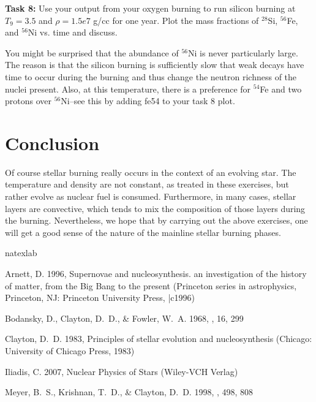 \documentclass[manuscript]{aastex62}
\begin{document}
{\bf Task 8:}  Use your output from your oxygen burning to run silicon burning
at $T_9 = 3.5$ and $\rho = 1.5e7$ g/cc for one year.
Plot the mass fractions of
$^{28}$Si, $^{56}$Fe, and $^{56}$Ni vs. time and discuss.

You might be surprised that the abundance of $^{56}$Ni is never particularly
large.  The reason is that the silicon burning is sufficiently slow that
weak decays have time to occur during the burning and thus change the
neutron richness of the nuclei present.  Also, at this temperature, there
is a preference for $^{54}$Fe and two protons over $^{56}$Ni--see this by
adding fe54 to your task 8 plot.

\section{Conclusion}

Of course stellar burning really occurs in the context of an evolving star.
The temperature and density are not constant, as treated in these exercises,
but rather evolve as nuclear fuel is consumed.  Furthermore, in many cases,
stellar layers are convective, which tends to mix the composition of those
layers during the burning.  
Nevertheless, we hope that by
carrying out the above exercises, one will get a good sense of the
nature of the mainline stellar burning phases.

\begin{thebibliography}{5}
\expandafter\ifx\csname natexlab\endcsname\relax\def\natexlab#1{#1}\fi

{Arnett}, D. 1996, {Supernovae and nucleosynthesis. an investigation of the
  history of matter, from the Big Bang to the present} (Princeton series in
  astrophysics, Princeton, NJ: Princeton University Press, |c1996)

{Bodansky}, D., {Clayton}, D.~D., \& {Fowler}, W.~A. 1968, \apjs, 16, 299

{Clayton}, D.~D. 1983, {Principles of stellar evolution and nucleosynthesis}
  (Chicago: University of Chicago Press, 1983)

{Iliadis}, C. 2007, {Nuclear Physics of Stars} (Wiley-VCH Verlag)

{Meyer}, B.~S., {Krishnan}, T.~D., \& {Clayton}, D.~D. 1998, \apj, 498, 808

\end{thebibliography}
\end{document}
